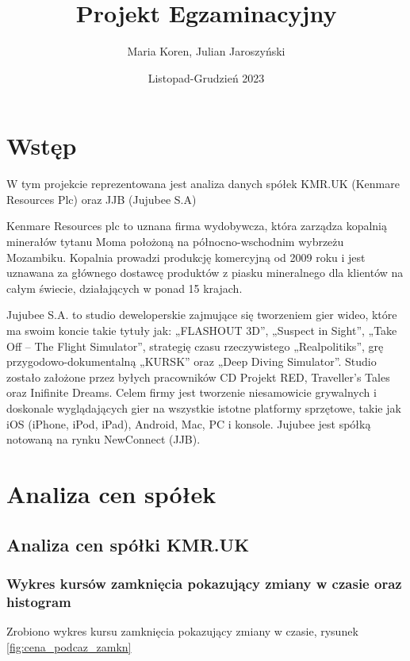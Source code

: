 \documentclass[a4paper,11pt]{article}
\title{Projekt Egzaminacyjny}
\author{Maria Koren, Julian Jaroszyński}
\date{Listopad-Grudzień 2023}
\begin{document}
\maketitle
\newpage
\tableofcontents{}
\newpage

\section{Wstęp}
W tym projekcie reprezentowana jest analiza danych spółek KMR.UK (Kenmare Resources Plc) oraz JJB (Jujubee S.A)

Kenmare Resources plc to uznana firma wydobywcza, która zarządza kopalnią minerałów tytanu Moma położoną na północno-wschodnim wybrzeżu Mozambiku.
Kopalnia prowadzi produkcję komercyjną od 2009 roku i jest uznawana za głównego dostawcę produktów z piasku mineralnego dla klientów na całym świecie, działających w ponad
15 krajach.

Jujubee S.A. to studio deweloperskie zajmujące
się tworzeniem gier wideo, które ma swoim koncie
takie tytuły jak: „FLASHOUT 3D”, „Suspect in
Sight”, „Take Off – The Flight Simulator”,
strategię czasu rzeczywistego „Realpolitiks”, grę
przygodowo-dokumentalną „KURSK” oraz „Deep Diving
Simulator”. Studio zostało założone przez byłych
pracowników CD Projekt RED, Traveller’s Tales oraz
Inifinite Dreams. Celem firmy jest tworzenie niesamowicie
grywalnych i doskonale wyglądających gier na wszystkie
istotne platformy sprzętowe, takie jak iOS (iPhone,
iPod, iPad), Android, Mac, PC i konsole. Jujubee jest
spółką notowaną na rynku NewConnect (JJB).

\newpage
\section{Analiza cen spółek}
\subsection{Analiza cen spółki KMR.UK}
\subsubsection{Wykres kursów zamknięcia pokazujący zmiany w czasie oraz
histogram}

Zrobiono wykres  kursu zamknięcia pokazujący zmiany w czasie, rysunek \ref{fig:cena_podcaz_zamkn}
\end{document}
